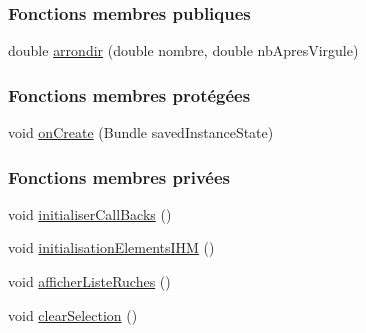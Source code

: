 \subsubsection*{Fonctions membres publiques}
\begin{DoxyCompactItemize}
\item 
double \hyperlink{classfr_1_1campus_1_1laurainc_1_1honeybee_1_1_graph_activity_aaf3c4463ff3eba3ea6e5e2ce28b2c060}{arrondir} (double nombre, double nb\+Apres\+Virgule)
\end{DoxyCompactItemize}
\subsubsection*{Fonctions membres protégées}
\begin{DoxyCompactItemize}
\item 
void \hyperlink{classfr_1_1campus_1_1laurainc_1_1honeybee_1_1_graph_activity_a0a59a4caee62f5c1ce090274c1df66b8}{on\+Create} (Bundle saved\+Instance\+State)
\end{DoxyCompactItemize}
\subsubsection*{Fonctions membres privées}
\begin{DoxyCompactItemize}
\item 
void \hyperlink{classfr_1_1campus_1_1laurainc_1_1honeybee_1_1_graph_activity_a8dc56c3e0744bcb9295ad10e726b5fdb}{initialiser\+Call\+Backs} ()
\item 
void \hyperlink{classfr_1_1campus_1_1laurainc_1_1honeybee_1_1_graph_activity_a7000895983725c6f795f7c73c1fafd20}{initialisation\+Elements\+I\+HM} ()
\item 
void \hyperlink{classfr_1_1campus_1_1laurainc_1_1honeybee_1_1_graph_activity_a9e7c089cbecac26d4251fa5310038107}{afficher\+Liste\+Ruches} ()
\item 
void \hyperlink{classfr_1_1campus_1_1laurainc_1_1honeybee_1_1_graph_activity_a08cfe45ba23b2f1c40e9812bfe1a1f01}{clear\+Selection} ()
\end{DoxyCompactItemize}
